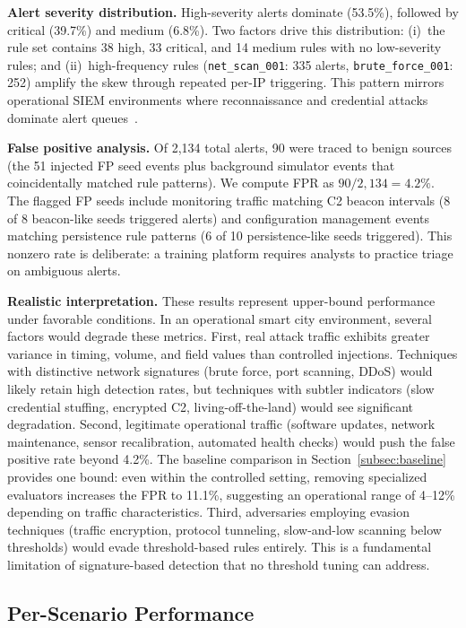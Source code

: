 \documentclass[conference,10pt]{IEEEtran}
\begin{document}
\textbf{Alert severity distribution.} High-severity alerts dominate (53.5\%), followed by critical (39.7\%) and medium (6.8\%). Two factors drive this distribution: (i)~the rule set contains 38 high, 33 critical, and 14 medium rules with no low-severity rules; and (ii)~high-frequency rules (\texttt{net\_scan\_001}: 335 alerts, \texttt{brute\_force\_001}: 252) amplify the skew through repeated per-IP triggering. This pattern mirrors operational SIEM environments where reconnaissance and credential attacks dominate alert queues~\cite{husak2019survey}.

\textbf{False positive analysis.} Of 2,134 total alerts, 90 were traced to benign sources (the 51 injected FP seed events plus background simulator events that coincidentally matched rule patterns). We compute FPR as $90 / 2{,}134 = 4.2\%$. The flagged FP seeds include monitoring traffic matching C2 beacon intervals (8 of 8 beacon-like seeds triggered alerts) and configuration management events matching persistence rule patterns (6 of 10 persistence-like seeds triggered). This nonzero rate is deliberate: a training platform requires analysts to practice triage on ambiguous alerts.

\textbf{Realistic interpretation.} These results represent upper-bound performance under favorable conditions. In an operational smart city environment, several factors would degrade these metrics. First, real attack traffic exhibits greater variance in timing, volume, and field values than controlled injections. Techniques with distinctive network signatures (brute force, port scanning, DDoS) would likely retain high detection rates, but techniques with subtler indicators (slow credential stuffing, encrypted C2, living-off-the-land) would see significant degradation. Second, legitimate operational traffic (software updates, network maintenance, sensor recalibration, automated health checks) would push the false positive rate beyond 4.2\%. The baseline comparison in Section~\ref{subsec:baseline} provides one bound: even within the controlled setting, removing specialized evaluators increases the FPR to 11.1\%, suggesting an operational range of 4--12\% depending on traffic characteristics. Third, adversaries employing evasion techniques (traffic encryption, protocol tunneling, slow-and-low scanning below thresholds) would evade threshold-based rules entirely. This is a fundamental limitation of signature-based detection that no threshold tuning can address.

\subsection{Per-Scenario Performance}
\end{document}
